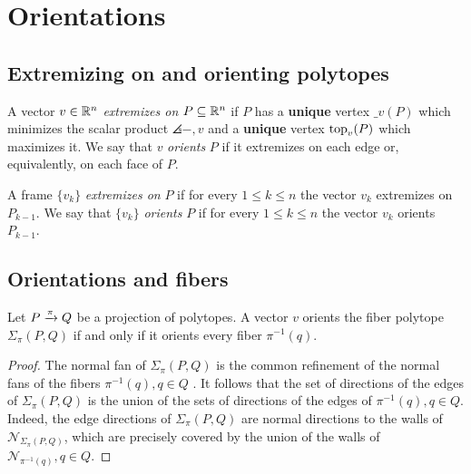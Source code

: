 
\section{Orientations}

\noindent{}

\subsection{Extremizing on and orienting polytopes}

A vector $v \in \mathbb{R}^n$ \textit{extremizes on} $P \subseteq \mathbb{R}^n$ if $P$ has a \textbf{unique} vertex $\bm_v(P)$ which minimizes the scalar product $\angles{-,v}$ and a \textbf{unique} vertex $\operatorname{top}_v(P)$ which maximizes it.
We say that $v$ \textit{orients} $P$ if it extremizes on each edge or, equivalently, on each face of $P$.

A frame $\{v_k\}$ \textit{extremizes on} $P$ if for every $1 \leq k \leq n$ the vector $v_k$ extremizes on $P_{k-1}$.
We say that $\{v_k\}$ \textit{orients} $P$ if for every $1 \leq k \leq n$ the vector $v_k$ orients $P_{k-1}$.



\subsection{Orientations and fibers}

\begin{lemma} \label{l:orients-the-fibers}
	Let $P \xrightarrow{\pi} Q$ be a projection of polytopes.
	A vector $v$ orients the fiber polytope $\Sigma_\pi(P, Q)$ if and only if it orients every fiber $\pi^{-1}(q)$.
\end{lemma}

\begin{proof}
	The normal fan of $\Sigma_\pi(P,Q)$ is the common refinement of the normal fans of the fibers $\pi^{-1}(q), q \in Q$ \cite[Proposition 2.2]{BilleraSturmfels94}.
	It follows that the set of directions of the edges of $\Sigma_\pi(P,Q)$ is the union of the sets of directions of the edges of $\pi^{-1}(q), q \in Q$.
	Indeed, the edge directions of $\Sigma_\pi(P,Q)$ are normal directions to the walls of $\mathcal{N}_{\Sigma_\pi(P,Q)}$, which are precisely covered by the union of the walls of $\mathcal{N}_{\pi^{-1}(q)}, q \in Q$.
\end{proof}

